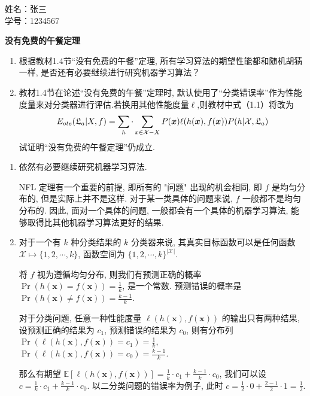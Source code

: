 \documentclass[answers]{exam}  %
\begin{document}
\Large
\noindent
姓名：张三 \\
学号：1234567 \\
\begin{questions}
  \question [20] \textbf{没有免费的午餐定理}

  \begin{enumerate}
    \item 根据教材1.4节“没有免费的午餐”定理, 所有学习算法的期望性能都和随机胡猜一样, 是否还有必要继续进行研究机器学习算法？
    \item 教材1.4节在论述“没有免费的午餐”定理时, 默认使用了“分类错误率”作为性能度量来对分类器进行评估.若换用其他性能度量$\ell$,则教材中式（1.1）将改为
          \begin{equation}
            E_{ote}(\mathfrak{L}_a|X,f)=\sum_h \cdot\sum_{x\in\mathcal{X}-X}P({\boldsymbol{x}})\ell(h({\boldsymbol{x}}),f({\boldsymbol{x}}))P(h|\mathcal{X},\mathfrak{L}_a)
          \end{equation}
          试证明“没有免费的午餐定理”仍成立.
  \end{enumerate}
  \begin{solution}
    \begin{enumerate}
      \item 依然有必要继续研究机器学习算法.

            NFL 定理有一个重要的前提, 即所有的 "问题" 出现的机会相同, 即 $f$ 是均匀分布的, 但是实际上并不是这样. 对于某一类具体的问题来说, $f$ 一般都不是均匀分布的. 因此, 面对一个具体的问题, 一般都会有一个具体的机器学习算法, 能够取得比其他机器学习算法更好的结果.

      \item 对于一个有 $k$ 种分类结果的 $k$ 分类器来说, 其真实目标函数可以是任何函数 $\mathcal{X}\mapsto \{ 1,2,\cdots ,k \}$, 函数空间为 $\{ 1,2,\cdots ,k \}^{|\mathcal{X}|}$.

            将 $f$ 视为遵循均匀分布, 则我们有预测正确的概率 $\displaystyle \operatorname{Pr}(h(\bm{x})=f(\bm{x}))=\frac{1}{k}$, 是一个常数. 预测错误的概率是 $\displaystyle \operatorname{Pr}(h(\bm{x})\neq f(\bm{x}))=\frac{k-1}{k}$.

            对于分类问题, 任意一种性能度量 $\ell(h(\bm{x}), f(\bm{x}))$ 的输出只有两种结果, 设预测正确的结果为 $c_1$, 预测错误的结果为 $c_0$, 则有分布列 $\displaystyle \operatorname{Pr}(\ell(h(\bm{x}), f(\bm{x}))=c_1) = \frac{1}{k}$, $\displaystyle \operatorname{Pr}(\ell(h(\bm{x}), f(\bm{x}))=c_0) = \frac{k-1}{k}$.

            那么有期望 $\displaystyle \mathbb{E}[\ell(h(\bm{x}), f(\bm{x}))] = \frac{1}{k}\cdot c_1+\frac{k-1}{k}\cdot c_0$, 我们可以设 $\displaystyle c=\frac{1}{k}\cdot c_1+\frac{k-1}{k}\cdot c_0$. 以二分类问题的错误率为例子, 此时 $\displaystyle c = \frac{1}{2}\cdot 0 + \frac{2-1}{2}\cdot 1 = \frac{1}{2}$.


\end{enumerate}
\end{solution}
\end{questions}
\end{document}
